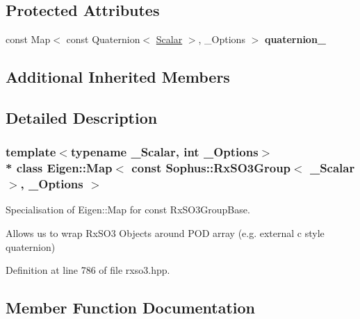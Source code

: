 \subsection*{Protected Attributes}
\begin{DoxyCompactItemize}
\item 
const Map$<$ const Quaternion$<$ \hyperlink{class_eigen_1_1_map_3_01const_01_sophus_1_1_rx_s_o3_group_3_01___scalar_01_4_00_01___options_01_4_a1d6dec9e4f7cd797ae48d46a7f99daba}{Scalar} $>$, \+\_\+\+Options $>$ {\bfseries quaternion\+\_\+}\hypertarget{class_eigen_1_1_map_3_01const_01_sophus_1_1_rx_s_o3_group_3_01___scalar_01_4_00_01___options_01_4_aa5eb74879caa618f4c0c2e7d32a24f01}{}\label{class_eigen_1_1_map_3_01const_01_sophus_1_1_rx_s_o3_group_3_01___scalar_01_4_00_01___options_01_4_aa5eb74879caa618f4c0c2e7d32a24f01}

\end{DoxyCompactItemize}
\subsection*{Additional Inherited Members}


\subsection{Detailed Description}
\subsubsection*{template$<$typename \+\_\+\+Scalar, int \+\_\+\+Options$>$\\*
class Eigen\+::\+Map$<$ const Sophus\+::\+Rx\+S\+O3\+Group$<$ \+\_\+\+Scalar $>$, \+\_\+\+Options $>$}

Specialisation of Eigen\+::\+Map for const Rx\+S\+O3\+Group\+Base. 

Allows us to wrap Rx\+S\+O3 Objects around P\+OD array (e.\+g. external c style quaternion) 

Definition at line 786 of file rxso3.\+hpp.



\subsection{Member Function Documentation}
